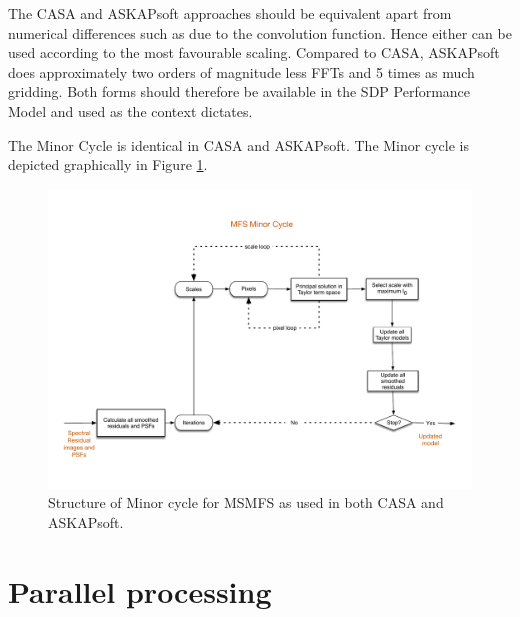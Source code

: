 \documentclass[11pt,a4paper,variablewidth]{article}
\begin{document}
The CASA and ASKAPsoft approaches should be equivalent apart from numerical differences such as due to the convolution function. Hence either can be used according to the most favourable scaling. Compared to CASA, ASKAPsoft does approximately two orders of magnitude less FFTs and 5 times as much gridding. Both forms should therefore be available in the SDP Performance Model and used as the context dictates.

The Minor Cycle is identical in CASA and ASKAPsoft. The Minor cycle is depicted graphically in Figure \ref{fig:minor}.

\begin{figure}[htb]
  \centering
  \includegraphics[width=\textwidth]{./MSMFS_Minor.pdf}
  \caption{Structure of Minor cycle for MSMFS as used in both CASA and ASKAPsoft.}
  \label{fig:minor}
\end{figure}


\clearpage
\section{Parallel processing}
\label{sec:parallel}
\end{document}
